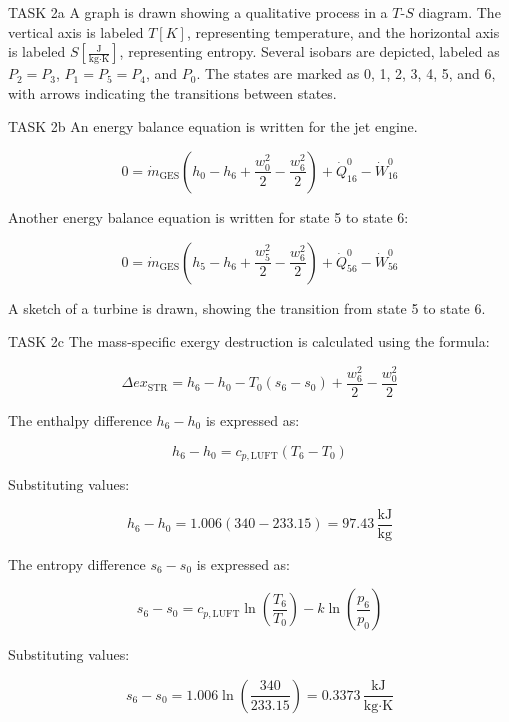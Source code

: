 TASK 2a  
A graph is drawn showing a qualitative process in a \( T \)-\( S \) diagram. The vertical axis is labeled \( T [K] \), representing temperature, and the horizontal axis is labeled \( S [\frac{\text{J}}{\text{kg·K}}] \), representing entropy. Several isobars are depicted, labeled as \( P_2 = P_3 \), \( P_1 = P_5 = P_4 \), and \( P_0 \). The states are marked as 0, 1, 2, 3, 4, 5, and 6, with arrows indicating the transitions between states.  

TASK 2b  
An energy balance equation is written for the jet engine.  

\[
0 = \dot{m}_{\text{GES}} \left( h_0 - h_6 + \frac{w_0^2}{2} - \frac{w_6^2}{2} \right) + \dot{Q}_{16}^0 - \dot{W}_{16}^0
\]

Another energy balance equation is written for state 5 to state 6:  

\[
0 = \dot{m}_{\text{GES}} \left( h_5 - h_6 + \frac{w_5^2}{2} - \frac{w_6^2}{2} \right) + \dot{Q}_{56}^0 - \dot{W}_{56}^0
\]

A sketch of a turbine is drawn, showing the transition from state 5 to state 6.  

TASK 2c  
The mass-specific exergy destruction is calculated using the formula:  

\[
\Delta ex_{\text{STR}} = h_6 - h_0 - T_0 (s_6 - s_0) + \frac{w_6^2}{2} - \frac{w_0^2}{2}
\]

The enthalpy difference \( h_6 - h_0 \) is expressed as:  

\[
h_6 - h_0 = c_{p,\text{LUFT}} (T_6 - T_0)
\]

Substituting values:  

\[
h_6 - h_0 = 1.006 (340 - 233.15) = 97.43 \, \frac{\text{kJ}}{\text{kg}}
\]

The entropy difference \( s_6 - s_0 \) is expressed as:  

\[
s_6 - s_0 = c_{p,\text{LUFT}} \ln \left( \frac{T_6}{T_0} \right) - k \ln \left( \frac{p_6}{p_0} \right)
\]

Substituting values:  

\[
s_6 - s_0 = 1.006 \ln \left( \frac{340}{233.15} \right) = 0.3373 \, \frac{\text{kJ}}{\text{kg·K}}
\]
